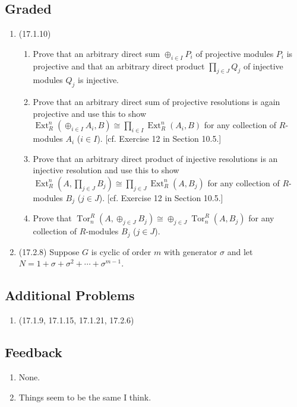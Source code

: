 \documentclass[11pt]{article}
\DeclareMathOperator{\Tor}{Tor}
\DeclareMathOperator{\Ext}{Ext}
\begin{document}
\subsection*{Graded}
\begin{enumerate}
    \item (17.1.10) \begin{enumerate}
        \item Prove that an arbitrary direct sum $\oplus_{i\in I}P_i$ of projective modules $P_i$ is projective and that an arbitrary direct product $\prod_{j\in J}Q_j$ of injective modules $Q_j$ is injective.
        \item Prove that an arbitrary direct sum of projective resolutions is again projective and use this to show $\Ext_R^n(\oplus_{i\in I}A_i, B)\cong \prod_{i\in I}\Ext_R^n(A_i,B)$ for any collection of $R$-modules $A_i$ ($i\in I$). [cf. Exercise 12 in Section 10.5.]
        \item Prove that an arbitrary direct product of injective resolutions is an injective resolution and use this to show $\Ext_R^n(A,\prod_{j\in J}B_j)\cong \prod_{j\in J}\Ext_R^n(A,B_j)$ for any collection of $R$-modules $B_j$ ($j\in J$). [cf. Exercise 12 in Section 10.5.]
        \item Prove that $\Tor_n^R(A,\oplus_{j\in J}B_j)\cong \oplus_{j\in J}\Tor_n^R(A,B_j)$ for any collection of $R$-modules $B_j$ ($j\in J$).
    \end{enumerate}
    \item (17.2.8) Suppose $G$ is cyclic of order $m$ with generator $\sigma$ and let $N = 1+\sigma + \sigma^2 + \cdots + \sigma^{m-1}$.
\end{enumerate}
\subsection*{Additional Problems}
\begin{enumerate}
    \item (17.1.9, 17.1.15, 17.1.21, 17.2.6)
\end{enumerate}
\subsection*{Feedback}
\begin{enumerate}
    \item None.
    \item Things seem to be the same I think.
\end{enumerate}
\end{document}
